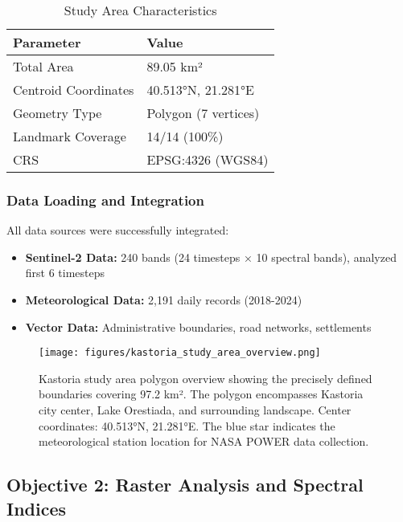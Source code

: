 \documentclass[a4paper,12pt]{article}
\begin{document}
\begin{table}[H]
    \centering
    \caption{Study Area Characteristics}
    \begin{tabular}{@{}ll@{}}
        \toprule
        Parameter            & Value                \\
        \midrule
        Total Area           & 89.05 km²            \\
        Centroid Coordinates & 40.513°N, 21.281°E  \\
        Geometry Type        & Polygon (7 vertices) \\
        Landmark Coverage    & 14/14 (100\%)        \\
        CRS                  & EPSG:4326 (WGS84)    \\
        \bottomrule
    \end{tabular}
\end{table}

\subsubsection{Data Loading and Integration}

All data sources were successfully integrated:

\begin{itemize}
    \item \textbf{Sentinel-2 Data:} 240 bands (24 timesteps × 10 spectral bands), analyzed first 6 timesteps
    \item \textbf{Meteorological Data:} 2,191 daily records (2018-2024)
    \item \textbf{Vector Data:} Administrative boundaries, road networks, settlements
\end{itemize}

\begin{figure}[H]
    \centering
    \texttt{[image: figures/kastoria\_study\_area\_overview.png]}
    \caption{Kastoria study area polygon overview showing the precisely defined boundaries covering 97.2 km². The polygon encompasses Kastoria city center, Lake Orestiada, and surrounding landscape. Center coordinates: 40.513°N, 21.281°E. The blue star indicates the meteorological station location for NASA POWER data collection.}
    \label{fig:study_area}
\end{figure}

\subsection{Objective 2: Raster Analysis and Spectral Indices}
\end{document}
